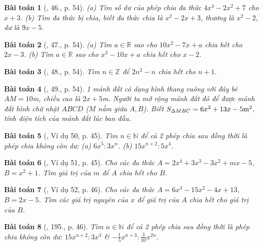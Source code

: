 \documentclass{article}
\newtheorem{baitoan}{Bài toán}
\begin{document}
\begin{baitoan}[\cite{SBT_Toan_7_Canh_Dieu_tap_2}, 46., p. 54]
	(a) Tìm số dư của phép chia đa thức $4x^4 - 2x^2 + 7$ cho $x + 3$. (b) Tìm đa thức bị chia, biết đa thức chia là $x^2 - 2x + 3$, thương là $x^2 - 2$, dư là $9x - 5$.
\end{baitoan}

\begin{baitoan}[\cite{SBT_Toan_7_Canh_Dieu_tap_2}, 47., p. 54]
	(a) Tìm $a\in\mathbb{R}$ sao cho $10x^2 - 7x + a$ chia hết cho $2x - 3$. (b) Tìm $a\in\mathbb{R}$ sao cho $x^3 - 10x + a$ chia hết cho $x - 2$.
\end{baitoan}

\begin{baitoan}[\cite{SBT_Toan_7_Canh_Dieu_tap_2}, 48., p. 54]
	Tìm $n\in\mathbb{Z}$ để $2n^2 - n$ chia hết cho $n + 1$.
\end{baitoan}

\begin{baitoan}[\cite{SBT_Toan_7_Canh_Dieu_tap_2}, 49., p. 54]
	1 mảnh đất có dạng hình thang vuông với đáy bé $AM = 10$\emph{m}, chiều cao là $2x + 5$\emph{m}. Người ta mở rộng mảnh đất đó để được mảnh đất hình chữ nhật $ABCD$ ($M$ nằm giữa $A,B$). Biết $S_{\Delta MBC} = 6x^2 + 13x - 5{\rm m}^2$, tính diện tích của mảnh đất lúc ban đầu.
\end{baitoan}

\begin{baitoan}[\cite{Tuyen_Toan_7}, Ví dụ 50, p. 45]
	Tìm $n\in\mathbb{N}$ để cả 2 phép chia sau đồng thời là phép chia không còn dư: (a) $6x^5:3x^n$. (b) $15x^{n+2}:5x^4$.
\end{baitoan}

\begin{baitoan}[\cite{Tuyen_Toan_7}, Ví dụ 51, p. 45]
	Cho các đa thức $A = 2x^4 + 3x^3 - 3x^2 + mx - 5$, $B = x^2 + 1$. Tìm giá trị của $m$ để $A$ chia hết cho $B$.
\end{baitoan}

\begin{baitoan}[\cite{Tuyen_Toan_7}, Ví dụ 52, p. 46]
	Cho các đa thức $A = 6x^3 - 15x^2 - 4x + 13$, $B = 2x - 5$. Tìm các giá trị nguyên của $x$ để giá trị của $A$ chia hết cho giá trị của $B$.
\end{baitoan}

\begin{baitoan}[\cite{Tuyen_Toan_7}, 195., p. 46]
	Tìm $n\in\mathbb{N}$ để cả 2 phép chia sau đồng thời là phép chia không còn dư: $15x^{n+2}:3x^3$ \& $-\frac{1}{5}x^{n+3}:\frac{3}{10}x^{2n}$.
\end{baitoan}
\end{document}
